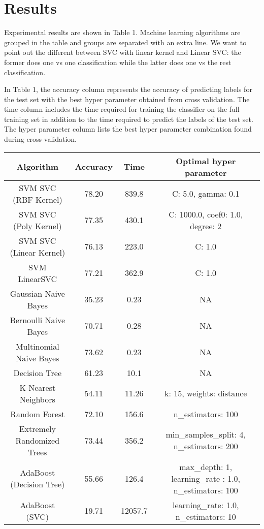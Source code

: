 \section{Results}

Experimental results are shown in Table 1. Machine
learning algorithms are grouped in the table and groups are separated
with an extra line. We want to point out the different between SVC
with linear kernel and Linear SVC: the former does one vs one
classification while the latter does one vs the rest classification. 

In Table 1, the accuracy column represents the accuracy of
predicting labels for the test set with the best hyper parameter
obtained from cross validation. The time column includes the time
required for training the classifier on the full training set in
addition to the time required to predict the labels of the test
set. The hyper parameter column lists the best hyper parameter
combination found during cross-validation. 

\begin{table}
\begin{center}
	\begin{tabular}{c|c|c|c}
    \hline
	     Algorithm   & Accuracy & Time & Optimal hyper parameter\\
         \hline
         SVM SVC (RBF Kernel)   & 78.20  & 839.8 & C: 5.0, gamma: 0.1\\
         \hline
         SVM SVC (Poly Kernel)  & 77.35  & 430.1 & C: 1000.0, coef0: 1.0, degree: 2\\
         \hline
         SVM SVC (Linear Kernel)   &  76.13  & 223.0 & C: 1.0\\
         \hline
         SVM LinearSVC    &  77.21   &362.9  & C: 1.0\\
         \hline
         \hline
         Gaussian Naive Bayes & 35.23 & 0.23 & NA \\
         \hline
         Bernoulli Naive Bayes &   70.71    & 0.28  & NA \\
         \hline
         Multinomial Naive Bayes & 73.62 	& 0.23  & NA \\
         \hline
         \hline
         Decision Tree &  61.23 & 10.1 & NA \\
         \hline
         \hline
         K-Nearest Neighbors & 54.11 & 11.26 & k: 15, weights:  distance\\
         \hline
         \hline
         Random Forest & 72.10 & 156.6 & n\_estimators: 100\\
         \hline
         Extremely Randomized Trees & 73.44 & 356.2 &
         min\_samples\_split: 4,
         n\_estimators: 200 \\
         \hline
         AdaBoost (Decision Tree) & 55.66 & 126.4 & max\_depth: 1, learning\_rate : 1.0, n\_estimators: 100\\
         \hline
         AdaBoost (SVC) & 19.71 & 12057.7 & learning\_rate: 1.0,
         n\_estimators: 10\\
         \hline
          \end{tabular}
\end{center}
\end{table}
